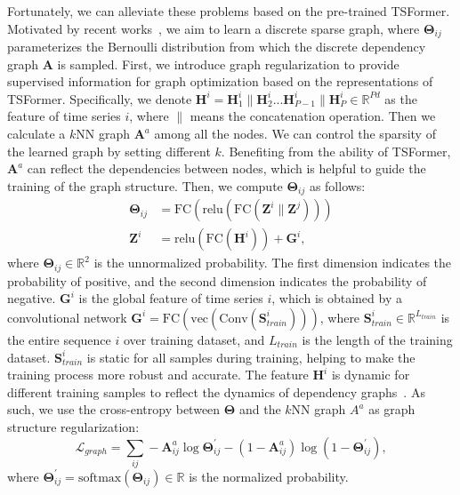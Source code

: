 \documentclass[sigconf]{acmart}
\begin{document}
Fortunately, we can alleviate these problems based on the pre-trained TSFormer.
Motivated by recent works~\cite{2018NRI, 2019LDS, 2021GTS}, we aim to learn a discrete sparse graph, where $\mathbf{\Theta}_{ij}$ parameterizes the Bernoulli distribution from which the discrete dependency graph $\mathbf{A}$ is sampled.
First, we introduce graph regularization to provide supervised information for graph optimization based on the representations of TSFormer.
Specifically, we denote $\mathbf{H}^i=\mathbf{H}^i_1\parallel\mathbf{H}^i_2...\mathbf{H}^i_{P-1}\parallel\mathbf{H}^i_{P}\in\mathbb{R}^{Pd}$ as the feature of time series $i$, where $\parallel$ means the concatenation operation.
Then we calculate a $k$NN graph $\mathbf{A}^a$ among all the nodes. We can control the sparsity of the learned graph by setting different $k$.
Benefiting from the ability of TSFormer, $\mathbf{A}^a$ can reflect the dependencies between nodes, which is helpful to guide the training of the graph structure.
Then, we compute $\mathbf{\Theta}_{ij}$ as follows:
\begin{equation}
    \begin{aligned}
    \mathbf{\Theta}_{ij}&=\text{FC}(\text{relu}(\text{FC}(\mathbf{Z}^i
    \parallel \mathbf{Z}^j)))\\
    \mathbf{Z}^i&= \text{relu}(\text{FC}(\mathbf{H}^i)) + \mathbf{G}^i,
    \end{aligned}
\end{equation}
where $\mathbf{\Theta}_{ij}\in \mathbb{R}^{2}$ is the unnormalized probability. The first dimension indicates the probability of positive, and the second dimension indicates  the probability of negative.
{\color{black}$\mathbf{G}^i$ is the global feature of time series $i$, which is obtained by a convolutional network $\mathbf{G}^i=\text{FC}(\text{vec}(\text{Conv}(\mathbf{S}^i_{train})))$, where
$\mathbf{S}^i_{train}\in \mathbb{R}^{L_{train}}$ is the entire sequence $i$ over training dataset, and $L_{train}$ is the length of the training dataset.}
$\mathbf{S}^i_{train}$ is static for all samples during training, helping to make the training process more robust and accurate.
The feature $\mathbf{H}^i$ is dynamic for different training samples to reflect the dynamics of dependency graphs~\cite{2021DGCRN}.
As such, we use the cross-entropy between $\mathbf{\Theta}$ and the $k$NN graph $A^a$ as graph structure regularization:
\begin{equation}
    \mathcal{L}_{graph} = \sum_{ij}-\mathbf{A}_{ij}^a\log\mathbf{\Theta}^{'}_{ij}-(1-\mathbf{A}_{ij}^{a})\log(1-\mathbf{\Theta}^{'}_{ij}),
\end{equation}
where $\mathbf{\Theta}^{'}_{ij}=\text{softmax}(\mathbf{\Theta}_{ij})\in\mathbb{R}$ is the normalized probability.
\end{document}
